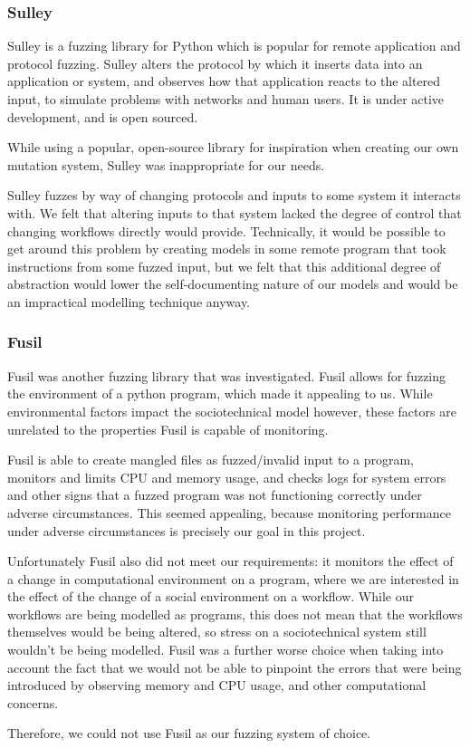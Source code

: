\subsubsection{Sulley}
\label{fuzzing_sulley}
Sulley is a fuzzing library for Python which is popular for remote application and protocol fuzzing. Sulley alters the protocol by which it inserts data into an application or system, and observes how that application reacts to the altered input, to simulate problems with networks and human users. It is under active development, and is open sourced.\par
While using a popular, open-source library for inspiration when creating our own mutation system, Sulley was inappropriate for our needs.\par
Sulley fuzzes by way of changing protocols and inputs to some system it interacts with. We felt that altering inputs to that system lacked the degree of control that changing workflows directly would provide. Technically, it would be possible to get around this problem by creating models in some remote program that took instructions from some fuzzed input, but we felt that this additional degree of abstraction would lower the self-documenting nature of our models and would be an impractical modelling technique anyway. \par

\subsubsection{Fusil}
\label{fuzzing_fuzil}
Fusil was another fuzzing library that was investigated. Fusil allows for fuzzing the environment of a python program, which made it appealing to us. While environmental factors impact the sociotechnical model however, these factors are unrelated to the properties Fusil is capable of monitoring. \par
Fusil is able to create mangled files as fuzzed/invalid input to a program, monitors and limits CPU and memory usage, and checks logs for system errors and other signs that a fuzzed program was not functioning correctly under adverse circumstances. This seemed appealing, because monitoring performance under adverse circumstances is precisely our goal in this project. \par
Unfortunately Fusil also did not meet our requirements: it monitors the effect of a change in computational environment on a program, where we are interested in the effect of the change of a social environment on a workflow. While our workflows are being modelled as programs, this does not mean that the workflows themselves would be being altered, so stress on a sociotechnical system still wouldn't be being modelled. Fusil was a further worse choice when taking into account the fact that we would not be able to pinpoint the errors that were being introduced by observing memory and CPU usage, and other computational concerns. \par
Therefore, we could not use Fusil as our fuzzing system of choice. \par

